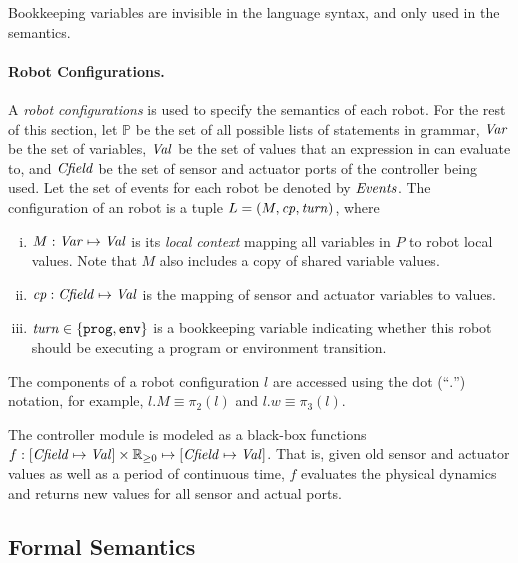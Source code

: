Bookkeeping variables are invisible in the language syntax, and only used in the semantics.


\paragraph{Robot Configurations.}

A \emph{robot configurations} is used to specify the semantics of each robot.
For the rest of this section, 
let $\mathbb{P}$ be the set of all possible lists of statements in \lgname grammar,
%
%
$\mathit{Var}$ be the set of variables, $\mathit{Val}$ be the set of values that an expression in \lgname can evaluate to,
and $\mathit{Cfield}$ be the set of sensor and actuator ports of the controller being used. 
%
Let the set of events for each robot be denoted by $\mathit{Events}$.
%
%
The configuration of an robot is a tuple $L = ({M},\mathit{cp},\mathit{turn})$, where

\begin{enumerate}[(i)]
\item ${M} : \mathit{Var} \mapsto \mathit{Val}$ is its \emph{local context} mapping all variables in $P$ to robot local values.
%
%
      Note that $M$ also includes a copy of shared variable values.
\item $\mathit{cp} : \mathit{Cfield} \mapsto \mathit{Val}$ is the mapping of sensor and actuator variables to values.
\item $\mathit{turn} \in \{\mathtt{prog},\mathtt{env}\}$ is a bookkeeping variable indicating whether this robot should be executing a program or environment transition.
\end{enumerate}
The components of a robot configuration  $l$ are accessed
using the dot (``$.$'') notation, for example, $l.M\equiv \pi_2(l)$ and $l.w \equiv \pi_3(l)$.
%
%

The controller module is modeled as a black-box functions
$f: [\Cfield \mapsto \Val] \times \nnreals \mapsto [\Cfield \mapsto \Val]$.
That is, given old sensor and actuator values as well as a period of continuous time,
$f$ evaluates the physical dynamics and returns new values for all sensor and actual ports.


\subsection{Formal Semantics}\label{sec:semantics}

